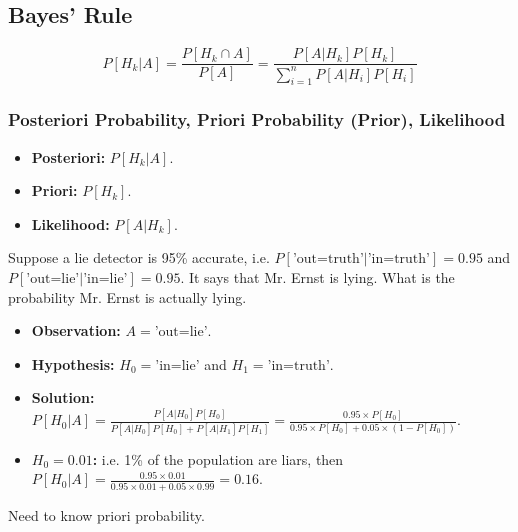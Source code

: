 \subsection{Bayes' Rule}
\begin{definition}
    \begin{equation}
        P[H_k|A] = \frac{P[H_k \cap A]}{P[A]} = \frac{P[A|H_k]P[H_k]}{\sum_{i=1}^{n} P[A|H_i]P[H_i]}
    \end{equation}
\end{definition}

\subsubsection{Posteriori Probability, Priori Probability (Prior), Likelihood}
\begin{definition}
    \begin{itemize}
        \item \textbf{Posteriori:} $P[H_k|A]$.
        \item \textbf{Priori:} $P[H_k]$.
        \item \textbf{Likelihood:} $P[A|H_k]$.
    \end{itemize}
\end{definition}

\begin{example}
    Suppose a lie detector is 95\% accurate, i.e. $P[\text{'out=truth'}|\text{'in=truth'}] = 0.95$ and $P[\text{'out=lie'}|\text{'in=lie'}] = 0.95$. It says that Mr. Ernst is lying. What is the probability Mr. Ernst is actually lying.
    \begin{itemize}
        \item \textbf{Observation:} $A = \text{'out=lie'}$.
        \item \textbf{Hypothesis:} $H_0 = \text{'in=lie'}$ and $H_1 = \text{'in=truth'}$.
        \item \textbf{Solution:} $P[H_0|A] = \frac{P[A|H_0]P[H_0]}{P[A|H_0]P[H_0] + P[A|H_1]P[H_1]} = \frac{0.95 \times P[H_0]}{0.95 \times P[H_0] + 0.05 \times (1 - P[H_0])}$.
        \item \textbf{$H_0 = 0.01$:} i.e. 1\% of the population are liars, then $P[H_0|A] = \frac{0.95 \times 0.01}{0.95 \times 0.01 + 0.05 \times 0.99} = 0.16$.
    \end{itemize}
\end{example}

\begin{warning}
    Need to know priori probability.
\end{warning}

